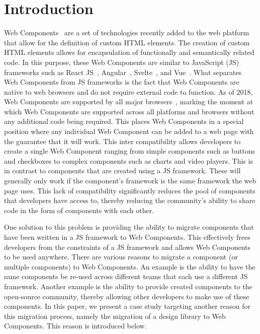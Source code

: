 \chapter{Introduction}
Web Components~ are a set of technologies recently added to the web platform that allow for the definition of custom HTML elements. The creation of custom HTML elements allows for encapsulation of functionally and semantically related code. In this purpose, these Web Components are similar to JavaScript (JS) frameworks such as React JS~, Angular~, Svelte~, and Vue~. What separates Web Components from JS frameworks is the fact that Web Components are native to web browsers and do not require external code to function. As of 2018, Web Components are supported by all major browsers~, marking the moment at which Web Components are supported across all platforms and browsers without any additional code being required. This places Web Components in a special position where any individual Web Component can be added to a web page with the guarantee that it will work. This inter compatibility allows developers to create a single Web Component ranging from simple components such as buttons and checkboxes to complex components such as charts and video players. This is in contrast to components that are created using a JS framework. These will generally only work if the component's framework is the same framework the web page uses. This lack of compatibility significantly reduces the pool of components that developers have access to, thereby reducing the community's ability to share code in the form of components with each other.

One solution to this problem is providing the ability to migrate components that have been written in a JS framework to Web Components. This effectively frees developers from the constraints of a JS framework and allows Web Components to be used anywhere. There are various reasons to migrate a component (or multiple components) to Web Components. An example is the ability to have the same components be re-used across different teams that each use a different JS framework. Another example is the ability to provide created components to the open-source community, thereby allowing other developers to make use of these components. In this paper, we present a case study targeting another reason for this migration process, namely the migration of a design library to Web Components. This reason is introduced below.

